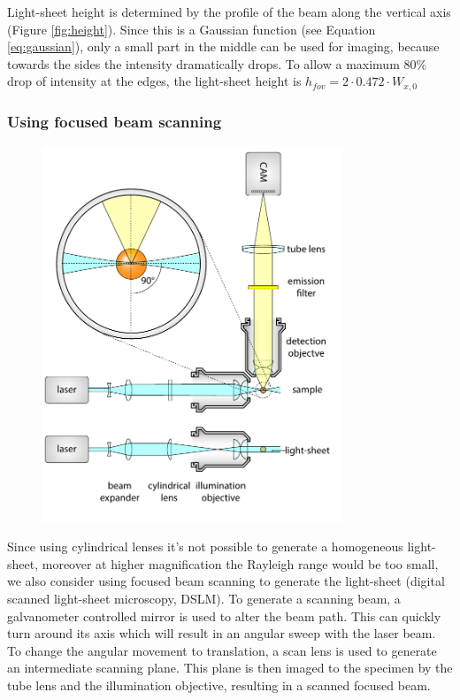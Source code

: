       Light-sheet height is determined by the profile of the beam along the vertical axis (Figure \ref{fig:height}). Since this is a Gaussian function (see Equation \ref{eq:gaussian}), only a small part in the middle can be used for imaging, because towards the sides the intensity dramatically drops. To allow a maximum 80\% drop of intensity at the edges, the light-sheet height is $h_{fov}=2\cdot 0.472\cdot W_{x,0}$
      

    \subsubsection{Using focused beam scanning}
      \begin{figure}[bt!]
        \centering
        \includegraphics[page=2,width=0.8\textwidth]{spim_cyl}
          \label{fig:dslm}
      \end{figure}

      Since using cylindrical lenses it's not possible to generate a homogeneous light-sheet, moreover at higher magnification the Rayleigh range would be too small, we also consider using focused beam scanning to generate the light-sheet (digital scanned light-sheet microscopy, DSLM). To generate a scanning beam, a galvanometer controlled mirror is used to alter the beam path. This can quickly turn around its axis which will result in an angular sweep with the laser beam. To change the angular movement to translation, a scan lens is used to generate an intermediate scanning plane. This plane is then imaged to the specimen by the tube lens and the illumination objective, resulting in a scanned focused beam.

